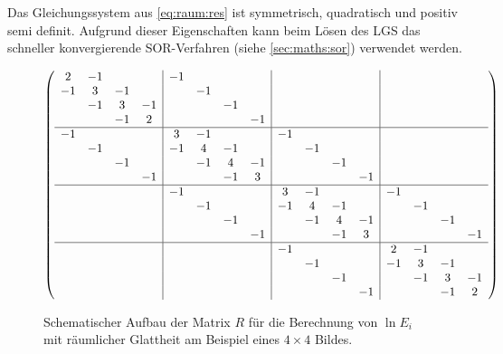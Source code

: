 Das Gleichungssystem aus \ref{eq:raum:res} ist symmetrisch, quadratisch und positiv semi definit. Aufgrund dieser Eigenschaften kann beim Lösen des \gls{LGS} das schneller konvergierende SOR-Verfahren (siehe \autoref{sec:maths:sor}) verwendet werden. 

\begin{figure}
  \begin{center}
\begin{align*}
    \left(
    \begin{array}{cccc|cccc|cccc|cccc}
    2 & -1 &   &    &-1 & & & & & & & & &    \\
    -1 & 3 & -1 &    & &-1 & & & && & & &    \\
    & -1 & 3 & -1    & & & -1 & & & & & & &    \\
    & & -1 & 2      & & & & -1 & & && & & &    \\
    \hline
    -1& & & &       3& -1 & & &     -1& & & &    \\
    & -1& & &       -1&4& -1 & &     &-1& & & &    \\
    & & -1&         & & -1 & 4 & -1& &&-1& & & &    \\    
    & & &-1         & & & -1 & 3 &  &&&-1& & & &    \\
    \hline
    & & & &    -1& & & &       3& -1 & & &     -1\\
    & & & &    & -1& & &       -1&4& -1 & &     &-1\\
    & & & &    & & -1&         & & -1 & 4 & -1& &&-1\\    
    & & & &    & & &-1         & & & -1 & 3 &  &&&-1\\
    \hline
    & & & &    & & & &    -1& & & &       2& -1\\
    & & & &    & & & &    & -1& & &       -1&3& -1\\
    & & & &    & & & &    & & -1&         & & -1 & 3 & -1\\    
    & & & &    & & & &    & & &-1         & & & -1 & 2\\
    \end{array}
    \right)
\end{align*}
\end{center}
\caption{Schematischer Aufbau der Matrix $R$ für die Berechnung von $\ln E_i$ mit räumlicher Glattheit am Beispiel eines $4 \times 4$ Bildes.}
\label{fig:raum:matrix}
\end{figure}


